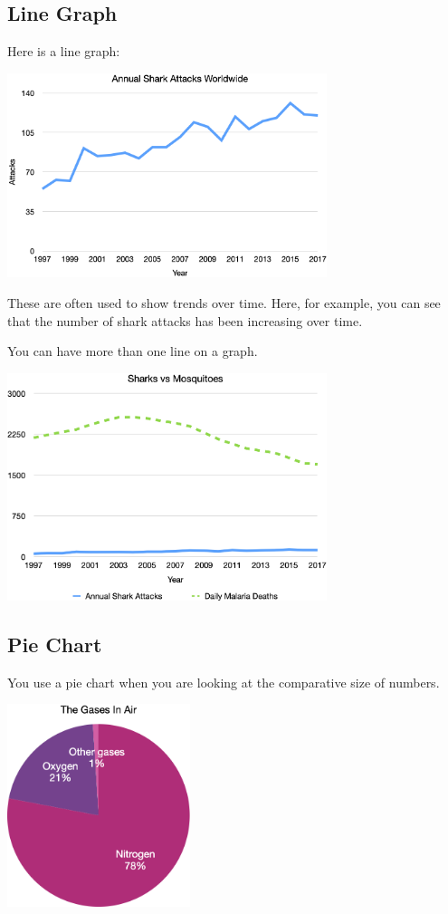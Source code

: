 \subsection{Line Graph}

Here is a line graph:

\includegraphics[width=0.7\textwidth]{SharksLine1.png}

These are often used to show trends over time. Here, for example, you
can see that the number of shark attacks has been increasing over
time.

You can have more than one line on a graph.

\includegraphics[width=0.7\textwidth]{SharksVsMosquitoes.png}

\subsection{Pie Chart}

You use a pie chart when you are looking at the comparative size of numbers.

\includegraphics[width=0.4\textwidth]{AirPie.png}

